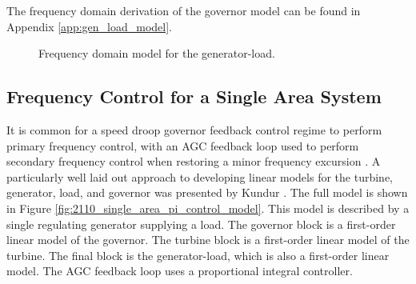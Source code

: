 The frequency domain derivation of the governor model can be found in Appendix \ref{app:gen_load_model}.

\begin{figure}[h]
	\centering
	
	\caption[Frequency domain model for generator-load]{Frequency domain model for the generator-load.}
	\label{fig:2109_generator_load_model}
\end{figure}



\subsection{Frequency Control for a Single Area System}\label{sec:control_one_area_system}
It is common for a speed droop governor feedback control regime to perform primary frequency control, with an AGC feedback loop used to perform secondary frequency control when restoring a minor frequency excursion \cite{Wood2013, Grainger1994, Kothari2011, Kundur1994}. A particularly well laid out approach to developing linear models for the turbine, generator, load, and governor was presented by Kundur \cite{Kundur1994}. The full model is shown in Figure \ref{fig:2110_single_area_pi_control_model}. This model is described by a single regulating generator supplying a load. The governor block is a first-order linear model of the governor. The turbine block is a first-order linear model of the turbine. The final block is the generator-load, which is also a first-order linear model. The AGC feedback loop uses a proportional integral controller.

\clearpage

\begin{sidewaysfigure}[ht]
\centering

\caption[Single power area with PI feedback control]{A classical feedback control approach for a single control area power system. The system is comprised of a first order models for both turbines, and generators. The governor controllers are also first order models. AGC is implemented using an integral control block in a feedback loop \cite{Kundur1994}.}
\label{fig:2110_single_area_pi_control_model}
\end{sidewaysfigure}

\clearpage


